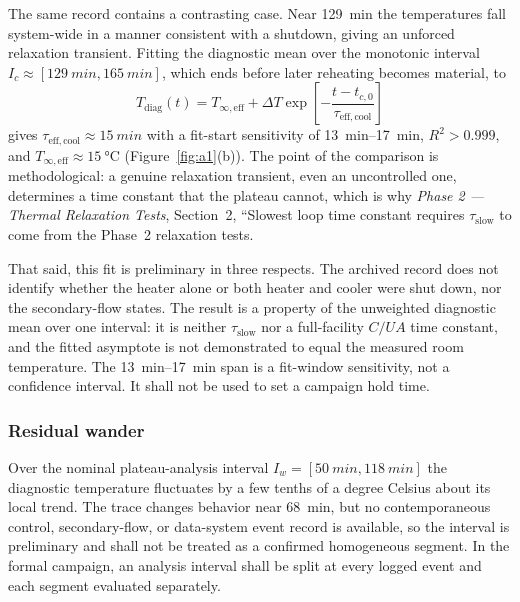 \documentclass[11pt]{article}
\newcommand{\Tdiag}{T_{\mathrm{diag}}}
\newcommand{\PhaseTwoDoc}{\textit{Phase 2 --- Thermal Relaxation Tests}}
\begin{document}
The same record contains a contrasting case. Near \SI{129}{min} the
temperatures fall system-wide in a manner consistent with a shutdown, giving an
unforced relaxation transient. Fitting the diagnostic mean over the monotonic
interval $I_c\approx[\SI{129}{min},\SI{165}{min}]$, which ends before later
reheating becomes material, to
\begin{equation}
\Tdiag(t)=T_{\infty,\mathrm{eff}}
+\Delta T\exp\!\left[-\frac{t-t_{c,0}}{\tau_{\mathrm{eff,cool}}}\right]
\label{eq:prelim_cooldown_fit}
\end{equation}
gives $\tau_{\mathrm{eff,cool}}\approx\SI{15}{min}$ with a fit-start
sensitivity of \SIrange{13}{17}{min}, $R^2>0.999$, and
$T_{\infty,\mathrm{eff}}\approx\SI{15}{\degreeCelsius}$
(Figure~\ref{fig:a1}(b)). The point of the comparison is methodological: a
genuine relaxation transient, even an uncontrolled one, determines a time
constant that the plateau cannot, which is why
\PhaseTwoDoc, Section~2, ``Slowest loop time constant requires $\tau_{\mathrm{slow}}$ to come from the
Phase~2 relaxation tests.

That said, this fit is preliminary in three respects. The archived record does
not identify whether the heater alone or both heater and cooler were shut down,
nor the secondary-flow states. The result is a property of the unweighted
diagnostic mean over one interval: it is neither $\tau_{\mathrm{slow}}$ nor a
full-facility $C/UA$ time constant, and the fitted asymptote is not
demonstrated to equal the measured room temperature. The
\SIrange{13}{17}{min} span is a fit-window sensitivity, not a confidence
interval. It shall not be used to set a campaign hold time.

\subsubsection{Residual wander}

Over the nominal plateau-analysis interval
$I_w=[\SI{50}{min},\SI{118}{min}]$ the diagnostic temperature fluctuates by a
few tenths of a degree Celsius about its local trend. The trace changes
behavior near \SI{68}{min}, but no contemporaneous control, secondary-flow, or
data-system event record is available, so the interval is preliminary and shall
not be treated as a confirmed homogeneous segment. In the formal campaign, an
analysis interval shall be split at every logged event and each segment
evaluated separately.
\end{document}
